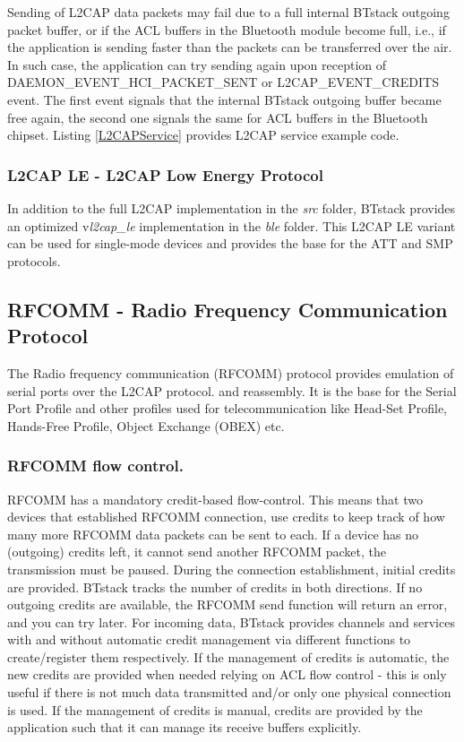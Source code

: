 Sending of L2CAP data packets may fail due to a full internal BTstack outgoing packet buffer, or if the ACL buffers in the Bluetooth module become full, i.e., if the application is sending faster than the packets can be transferred over the air. In such case, the application can try sending again upon reception of DAEMON\_EVENT\_HCI\_PACKET\_SENT or L2CAP\_EVENT\_CREDITS event. The first event signals that the internal BTstack outgoing buffer became free again, the second one signals the same for ACL buffers in the Bluetooth chipset. Listing \ref{L2CAPService} provides L2CAP service example code.


\subsubsection{L2CAP LE - L2CAP Low Energy Protocol}
In addition to the full L2CAP implementation in the \emph{src} folder, BTstack provides an optimized v\emph{l2cap\_le} implementation in the \emph{ble} folder. This L2CAP LE variant can be used for single-mode devices and provides the base for the ATT and SMP protocols.



\subsection{RFCOMM - Radio Frequency Communication Protocol}
The Radio frequency communication (RFCOMM) protocol provides emulation of serial ports over the L2CAP protocol.
and reassembly. It is the base for the Serial Port Profile and other profiles used for telecommunication like Head-Set Profile, Hands-Free Profile, Object Exchange (OBEX) etc.

\subsubsection{RFCOMM flow control.}
RFCOMM has a mandatory credit-based flow-control. This means that two devices that established RFCOMM connection, use credits to keep track of how many more RFCOMM data packets can be sent to each. If a device has no (outgoing) credits left, it cannot send another RFCOMM packet, the transmission must be paused. During the connection establishment, initial credits are provided. BTstack tracks the number of credits in both directions. If no outgoing credits are available, the RFCOMM send function will return an error, and you can try later. For incoming data, BTstack provides channels and services with and without automatic credit management via different functions to create/register them respectively. If the management of credits is automatic, the new credits are provided when needed relying on ACL flow control - this is only useful if there is not much data transmitted and/or only one physical connection is used. If the management of credits is manual, credits are provided by the application such that it can manage its receive buffers explicitly. 

